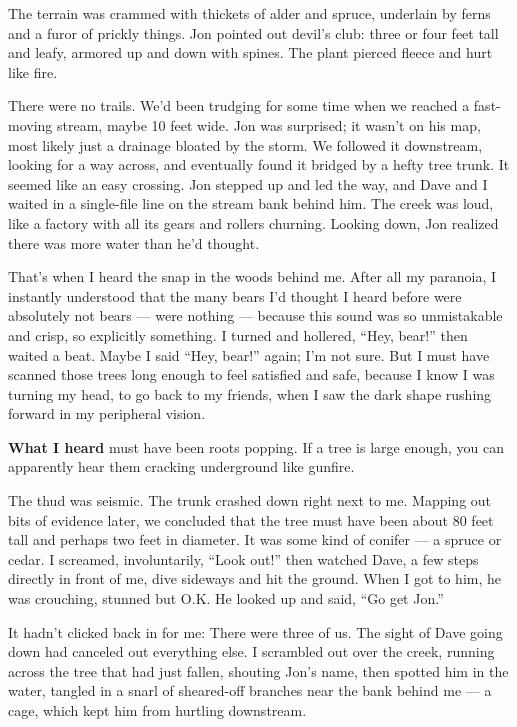 The terrain was crammed with thickets of alder and spruce, underlain by
ferns and a furor of prickly things. Jon pointed out devil's club: three
or four feet tall and leafy, armored up and down with spines. The plant
pierced fleece and hurt like fire.

There were no trails. We'd been trudging for some time when we reached a
fast-moving stream, maybe 10 feet wide. Jon was surprised; it wasn't on
his map, most likely just a drainage bloated by the storm. We followed
it downstream, looking for a way across, and eventually found it bridged
by a hefty tree trunk. It seemed like an easy crossing. Jon stepped up
and led the way, and Dave and I waited in a single-file line on the
stream bank behind him. The creek was loud, like a factory with all its
gears and rollers churning. Looking down, Jon realized there was more
water than he'd thought.

That's when I heard the snap in the woods behind me. After all my
paranoia, I instantly understood that the many bears I'd thought I heard
before were absolutely not bears --- were nothing --- because this sound
was so unmistakable and crisp, so explicitly something. I turned and
hollered, ``Hey, bear!'' then waited a beat. Maybe I said ``Hey, bear!''
again; I'm not sure. But I must have scanned those trees long enough to
feel satisfied and safe, because I know I was turning my head, to go
back to my friends, when I saw the dark shape rushing forward in my
peripheral vision.

\textbf{What I heard} must have been roots popping. If a tree is large
enough, you can apparently hear them cracking underground like gunfire.

The thud was seismic. The trunk crashed down right next to me. Mapping
out bits of evidence later, we concluded that the tree must have been
about 80 feet tall and perhaps two feet in diameter. It was some kind of
conifer --- a spruce or cedar. I screamed, involuntarily, ``Look out!''
then watched Dave, a few steps directly in front of me, dive sideways
and hit the ground. When I got to him, he was crouching, stunned but
O.K. He looked up and said, ``Go get Jon.''

It hadn't clicked back in for me: There were three of us. The sight of
Dave going down had canceled out everything else. I scrambled out over
the creek, running across the tree that had just fallen, shouting Jon's
name, then spotted him in the water, tangled in a snarl of sheared-off
branches near the bank behind me --- a cage, which kept him from
hurtling downstream.

